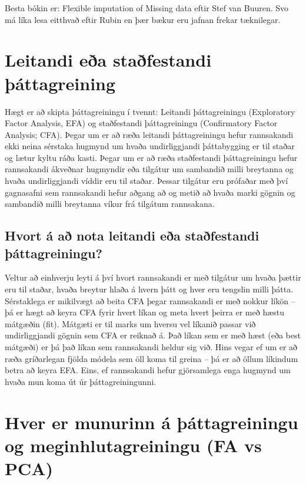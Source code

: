 \documentclass[]{book}
\begin{document}
Besta bókin er: Flexible imputation of Missing data eftir Stef van Buuren. Svo má líka lesa eitthvað eftir Rubin en þær bækur eru jafnan frekar tæknilegar.

\hypertarget{leitandi-euxf0a-stauxf0festandi-uxfeuxe1ttagreining}{%
\section{Leitandi eða staðfestandi þáttagreining}\label{leitandi-euxf0a-stauxf0festandi-uxfeuxe1ttagreining}}

Hægt er að skipta þáttagreiningu í tvennt: Leitandi þáttagreiningu (Exploratory Factor Analysis, EFA) og staðfestandi þáttagreiningu (Confirmatory Factor Analysis; CFA). Þegar um er að ræða leitandi þáttagreiningu hefur rannsakandi ekki neina sérstaka hugmynd um hvaða undirliggjandi þáttabygging er til staðar og lætur kyltu ráða kasti. Þegar um er að ræða staðfestandi þáttagreiningu hefur rannsakandi ákveðnar hugmyndir eða tilgátur um sambandið milli breytanna og hvaða undirliggjandi víddir eru til staðar. Þessar tilgátur eru prófaðar með því gagnasafni sem rannsakandi hefur aðgang að og metið að hvaða marki gögnin og sambandið milli breytanna víkur frá tilgátum rannsakana.

\hypertarget{hvort-uxe1-auxf0-nota-leitandi-euxf0a-stauxf0festandi-uxfeuxe1ttagreiningu}{%
\subsection{Hvort á að nota leitandi eða staðfestandi þáttagreiningu?}\label{hvort-uxe1-auxf0-nota-leitandi-euxf0a-stauxf0festandi-uxfeuxe1ttagreiningu}}

Veltur að einhverju leyti á því hvort rannsakandi er með tilgátur um hvaða þættir eru til staðar, hvaða breytur hlaða á hvern þátt og hver eru tengslin milli þátta. Sérstaklega er mikilvægt að beita CFA þegar rannsakandi er með nokkur líkön -- þá er hægt að keyra CFA fyrir hvert líkan og meta hvert þeirra er með hæstu mátgæðin (fit). Mátgæti er til marks um hversu vel líkanið passar við undirliggjandi gögnin sem CFA er reiknað á. Það líkan sem er með hæst (eða best mátgæði) er þá það líkan sem rannsakandi heldur sig við. Hins vegar ef um er að ræða gríðarlegan fjölda módela sem öll koma til greina -- þá er að öllum líkindum betra að keyra EFA. Eins, ef rannsakandi hefur gjörsamlega enga hugmynd um hvaða mun koma út úr þáttagreiningunni.

\hypertarget{hver-er-munurinn-uxe1-uxfeuxe1ttagreiningu-og-meginhlutagreiningu-fa-vs-pca}{%
\section{Hver er munurinn á þáttagreiningu og meginhlutagreiningu (FA vs PCA)}\label{hver-er-munurinn-uxe1-uxfeuxe1ttagreiningu-og-meginhlutagreiningu-fa-vs-pca}}
\end{document}

